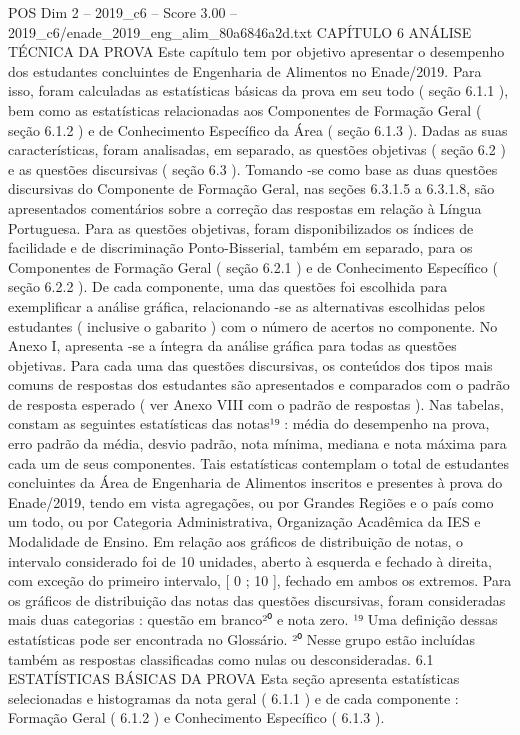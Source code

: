 \begin{textsample}{POS Dim 2 – 2019\_c6 – Score 3.00 – 2019\_c6/enade\_2019\_eng\_alim\_80a6846a2d.txt}  \label{ex:f2_pos_157}
CAPÍTULO 6 ANÁLISE TÉCNICA DA PROVA Este capítulo tem por objetivo apresentar o desempenho dos estudantes concluintes de Engenharia de Alimentos no Enade/2019.
Para isso, foram calculadas as estatísticas básicas da prova em seu todo ( seção 6.1.1 ), bem como as estatísticas relacionadas aos Componentes de Formação Geral ( seção 6.1.2 ) e de Conhecimento Específico da Área ( seção 6.1.3 ).
Dadas as suas características, foram analisadas, em separado, as questões objetivas ( seção 6.2 ) e as questões discursivas ( seção 6.3 ).
Tomando -se como base as duas questões discursivas do Componente de Formação Geral, nas seções 6.3.1.5 a 6.3.1.8, são apresentados comentários sobre a correção das respostas em relação à Língua Portuguesa.
Para as questões objetivas, foram disponibilizados os índices de facilidade e de discriminação Ponto-Bisserial, também em separado, para os Componentes de Formação Geral ( seção 6.2.1 ) e de Conhecimento Específico ( seção 6.2.2 ).
De cada componente, uma das questões foi escolhida para exemplificar a análise gráfica, relacionando -se as alternativas escolhidas pelos estudantes ( inclusive o gabarito ) com o número de acertos no componente.
No Anexo I, apresenta -se a íntegra da análise gráfica para todas as questões objetivas.
Para cada uma das questões discursivas, os conteúdos dos tipos mais comuns de respostas dos estudantes são apresentados e comparados com o padrão de resposta esperado ( ver Anexo VIII com o padrão de respostas ).
Nas tabelas, constam as seguintes estatísticas das notas¹⁹ : média do desempenho na prova, erro padrão da média, desvio padrão, nota mínima, mediana e nota máxima para cada um de seus componentes.
Tais estatísticas contemplam o total de estudantes concluintes da Área de Engenharia de Alimentos inscritos e presentes à prova do Enade/2019, tendo em vista agregações, ou por Grandes Regiões e o país como um todo, ou por Categoria Administrativa, Organização Acadêmica da IES e Modalidade de Ensino.
Em relação aos gráficos de distribuição de notas, o intervalo considerado foi de 10 unidades, aberto à esquerda e fechado à direita, com exceção do primeiro intervalo, [ 0 ; 10 ], fechado em ambos os extremos.
Para os gráficos de distribuição das notas das questões discursivas, foram consideradas mais duas categorias : questão em branco²⁰ e nota zero. ¹⁹ Uma definição dessas estatísticas pode ser encontrada no Glossário. ²⁰ Nesse grupo estão incluídas também as respostas classificadas como nulas ou desconsideradas. 6.1 ESTATÍSTICAS BÁSICAS DA PROVA Esta seção apresenta estatísticas selecionadas e histogramas da nota geral ( 6.1.1 ) e de cada componente : Formação Geral ( 6.1.2 ) e Conhecimento Específico ( 6.1.3 ).

\end{textsample}
